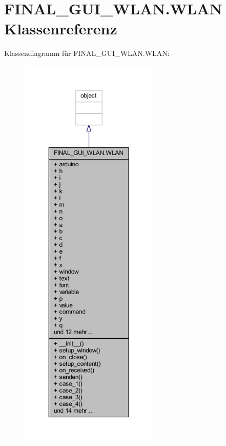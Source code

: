 \hypertarget{class_f_i_n_a_l___g_u_i___w_l_a_n_1_1_w_l_a_n}{}\section{F\+I\+N\+A\+L\+\_\+\+G\+U\+I\+\_\+\+W\+L\+A\+N.\+W\+L\+AN Klassenreferenz}
\label{class_f_i_n_a_l___g_u_i___w_l_a_n_1_1_w_l_a_n}


Klassendiagramm für F\+I\+N\+A\+L\+\_\+\+G\+U\+I\+\_\+\+W\+L\+A\+N.\+W\+L\+AN\+:\nopagebreak
\begin{figure}[H]
\begin{center}
\leavevmode
\includegraphics[height=550pt]{class_f_i_n_a_l___g_u_i___w_l_a_n_1_1_w_l_a_n__inherit__graph}
\end{center}
\end{figure}


